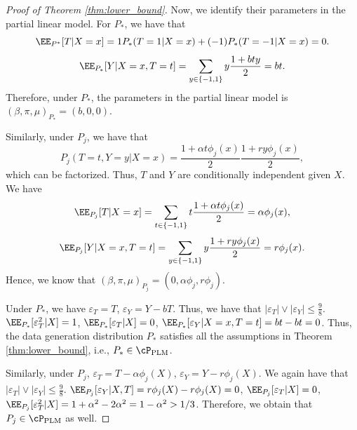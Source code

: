 \documentclass[11pt]{article}
\begin{document}
\begin{proof}[Proof of Theorem \ref{thm:lower_bound}]
Now, we identify their parameters in the partial linear model.
For $P_*$, we have that
\[
\EE_{P^*}[T|X=x]=1P_*(T=1|X=x)+(-1)P_*(T=-1|X=x)=0.
\]
\[
\EE_{P_*}[Y|X=x,T=t]=\sum_{y\in\{-1,1\}}y\frac{1+bty}{2}=bt.
\]
Therefore, under $P_*$, the parameters in the partial linear model is $(\beta,\pi,\mu)_{P_*}=(b,0,0)$.

Similarly, under $P_j$, we have that
\[
P_j(T=t,Y=y|X=x)=\frac{1+\alpha t\phi_j(x)}{2}\frac{1+ry\phi_j(x)}{2},
\]
which can be factorized. Thus, $T$ and $Y$ are conditionally independent given $X$. We have
\[
\EE_{P_j}[T|X=x]=\sum_{t\in\{-1,1\}}t\frac{1+\alpha t\phi_j(x)}{2}=\alpha\phi_j(x),
\]
\[
\EE_{P_j}[Y|X=x,T=t]=\sum_{y\in\{-1,1\}}y \frac{1+ry\phi_j(x)}{2}=r\phi_j(x).
\]
Hence, we know that $(\beta,\pi,\mu)_{P_j}=(0,\alpha\phi_j,r\phi_j)$.

Under $P_*$, we have $\varepsilon_T=T$, $\varepsilon_Y=Y-bT$. Thus, we have that $|\varepsilon_T|\vee|\varepsilon_Y|\le \frac{9}{8}$. $\EE_{P_*}[\varepsilon_T^2|X]=1$, $\EE_{P_*}[\varepsilon_T|X]=0$, $\EE_{P_*}[\varepsilon_Y|X=x,T=t]=bt-bt=0$. Thus, the data generation distribution $P_*$ satisfies all the assumptions in Theorem \ref{thm:lower_bound}, i.e., $P_*\in\cP_{\text{PLM}}$.

Similarly, under $P_j$, $\varepsilon_T=T-\alpha\phi_j(X)$, $\varepsilon_Y=Y-r\phi_j(X)$. We again have that $|\varepsilon_T|\vee|\varepsilon_Y|\le \frac{9}{8}$. $\EE_{P_j}[\varepsilon_Y|X,T]=r\phi_j(X)-r\phi_j(X)=0$, $\EE_{P_j}[\varepsilon_T|X]=0$, $\EE_{P_j}[\varepsilon_T^2|X]=1+\alpha^2-2\alpha^2=1-\alpha^2> 1/3$.
Therefore, we obtain that $P_j\in\cP_{\text{PLM}}$ as well.


\end{proof}
\end{document}
